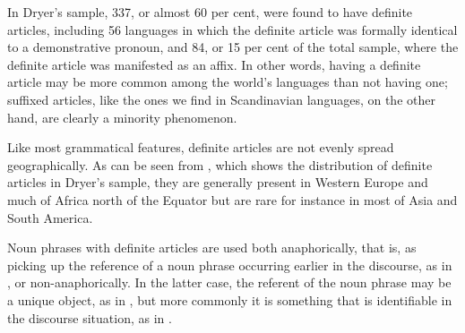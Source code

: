 In Dryer’s sample, 337, or almost 60 per cent, were found to have definite articles, including 56 languages in which the definite article was formally identical to a demonstrative pronoun, and 84, or 15 per cent of the total sample, where the definite article was manifested as an affix. In other words, having a definite article may be more common among the world’s languages than not having one; suffixed articles, like the ones we find in Scandinavian languages, on the other hand, are clearly a minority phenomenon. 

Like most grammatical features, definite articles are not evenly spread geographically. As can be seen from , which shows the distribution of definite articles in Dryer’s sample, they are generally present in Western Europe and much of Africa north of the Equator but are rare for instance in most of Asia and South America.

Noun phrases with definite articles are used both anaphorically, that is, as picking up the reference of a noun phrase occurring earlier in the discourse, as in , or non-anaphorically. In the latter case, the referent of the noun phrase may be a unique object, as in , but more commonly it is something that is identifiable in the discourse situation, as in .

